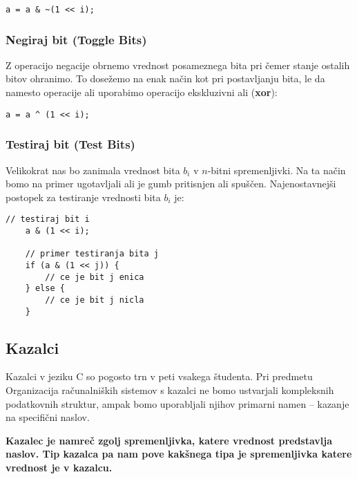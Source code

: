 \documentclass[12pt,letterpaper]{article}
\begin{document}
\begin{center}
\begin{lstlisting}[style=CStyle]
    a = a & ~(1 << i);
\end{lstlisting}
\end{center}

\subsubsection*{Negiraj bit (Toggle Bits)}

Z operacijo negacije obrnemo vrednost posameznega bita pri čemer stanje ostalih bitov ohranimo. To dosežemo na enak način kot pri postavljanju bita, le da namesto operacije ali uporabimo operacijo ekskluzivni ali (\textbf{xor}):

\begin{center}
\begin{lstlisting}[style=CStyle]
    a = a ^ (1 << i);
\end{lstlisting}
\end{center}
\newpage

\subsubsection*{Testiraj bit (Test Bits)}
Velikokrat nas bo zanimala vrednost bita $b_i$ v $n$-bitni spremenljivki. Na ta način bomo na primer ugotavljali ali je gumb pritisnjen ali spuščen. Najenostavnejši postopek za testiranje vrednosti bita $b_i$ je:

\begin{center}
\begin{lstlisting}[style=CStyle]
    // testiraj bit i
    a & (1 << i);
    
    // primer testiranja bita j
    if (a & (1 << j)) {
        // ce je bit j enica
    } else {
        // ce je bit j nicla
    }
\end{lstlisting}
\end{center}

\subsection*{Kazalci}

Kazalci v jeziku C so pogosto trn v peti vsakega študenta. Pri predmetu Organizacija računalniških sistemov s kazalci ne bomo ustvarjali kompleksnih podatkovnih struktur, ampak bomo uporabljali njihov primarni namen -- kazanje na specifični naslov.

\textbf{Kazalec je namreč zgolj spremenljivka, katere vrednost predstavlja naslov. Tip kazalca pa nam pove kakšnega tipa je spremenljivka katere vrednost je v kazalcu.}
\end{document}

